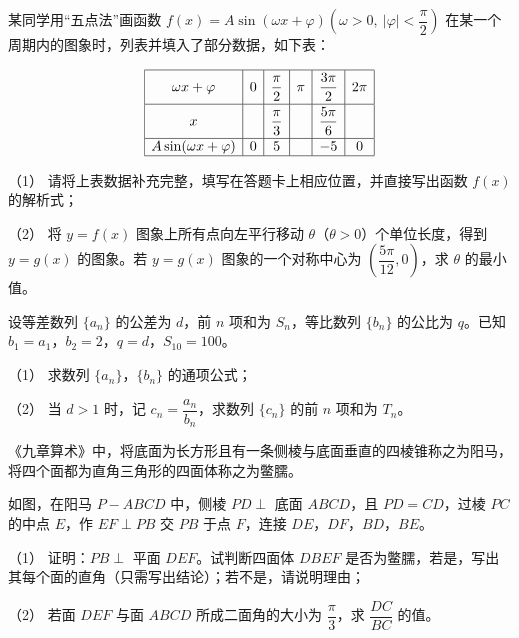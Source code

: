 \begin{question}
某同学用“五点法”画函数 \(f(x)=A\sin(\omega x+\varphi)\left(\omega>0,\ |\varphi|<\dfrac{\pi}{2}\right)\) 在某一个周期内的图象时，列表并填入了部分数据，如下表：

\nopagebreak[4]
\[
\begin{array}{|c|c|c|c|c|c|}
\hline
\rule{0pt}{1.5em}\omega x+\varphi & 0 & \dfrac{\pi}{2} & \pi & \dfrac{3\pi}{2} & 2\pi\\[0.55em]
\hline
\rule{0pt}{1.5em}x & & \dfrac{\pi}{3} & & \dfrac{5\pi}{6} & \\[0.55em]
\hline
A\sin(\omega x+\varphi) & 0 & 5 & & -5 & 0\\
\hline
\end{array}
\]

（1） 请将上表数据补充完整，填写在答题卡上相应位置，并直接写出函数 \(f(x)\) 的解析式；

（2） 将 \(y=f(x)\) 图象上所有点向左平行移动 \(\theta\)（\(\theta>0\)）个单位长度，得到 \(y=g(x)\) 的图象。若 \(y=g(x)\) 图象的一个对称中心为 \(\left(\dfrac{5\pi}{12},0\right)\)，求 \(\theta\) 的最小值。

\end{question}
\begin{question}
设等差数列 \(\{a_n\}\) 的公差为 \(d\)，前 \(n\) 项和为 \(S_n\)，等比数列 \(\{b_n\}\) 的公比为 \(q\)。已知 \(b_1=a_1\)，\(b_2=2\)，\(q=d\)，\(S_{10}=100\)。

（1） 求数列 \(\{a_n\}\)，\(\{b_n\}\) 的通项公式；

（2） 当 \(d>1\) 时，记 \(c_n=\dfrac{a_n}{b_n}\)，求数列 \(\{c_n\}\) 的前 \(n\) 项和为 \(T_n\)。

\Needspace{0.4\textheight}
\end{question}
\begin{question}
《九章算术》中，将底面为长方形且有一条侧棱与底面垂直的四棱锥称之为阳马，将四个面都为直角三角形的四面体称之为鳖臑。

如图，在阳马 \(P-ABCD\) 中，侧棱 \(PD\perp\) 底面 \(ABCD\)，且 \(PD=CD\)，过棱 \(PC\) 的中点 \(E\)，作 \(EF\perp PB\) 交 \(PB\) 于点 \(F\)，连接 \(DE\)，\(DF\)，\(BD\)，\(BE\)。

（1） 证明：\(PB\perp\) 平面 \(DEF\)。试判断四面体 \(DBEF\) 是否为鳖臑，若是，写出其每个面的直角（只需写出结论）；若不是，请说明理由；

（2） 若面 \(DEF\) 与面 \(ABCD\) 所成二面角的大小为 \(\dfrac{\pi}{3}\)，求 \(\dfrac{DC}{BC}\) 的值。
\nopagebreak[4]
\begin{center}\end{center}
\nopagebreak[4]
\end{question}
